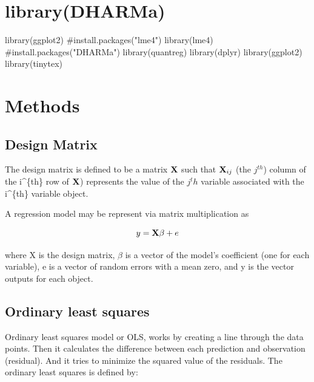 \documentclass[
  letterpaper,
  DIV=11,
  numbers=noendperiod]{scrreprt}
\newenvironment{Shaded}{\begin{snugshade}}{\end{snugshade}}
\newcommand{\CommentTok}[1]{\textcolor[rgb]{0.37,0.37,0.37}{#1}}
\newcommand{\FunctionTok}[1]{\textcolor[rgb]{0.28,0.35,0.67}{#1}}
\newcommand{\NormalTok}[1]{\textcolor[rgb]{0.00,0.23,0.31}{#1}}
\begin{document}

\hypertarget{librarydharma}{%
\chapter{library(DHARMa)}\label{librarydharma}}

\begin{Shaded}
\begin{Highlighting}[]
\FunctionTok{library}\NormalTok{(ggplot2)}
\CommentTok{\#install.packages("lme4")}
\FunctionTok{library}\NormalTok{(lme4)}
\CommentTok{\#install.packages("DHARMa")}
\FunctionTok{library}\NormalTok{(quantreg)}
\FunctionTok{library}\NormalTok{(dplyr)}
\FunctionTok{library}\NormalTok{(ggplot2)}
\FunctionTok{library}\NormalTok{(tinytex)}
\end{Highlighting}
\end{Shaded}


\hypertarget{methods}{%
\chapter{Methods}\label{methods}}

\hypertarget{design-matrix}{%
\section{Design Matrix}\label{design-matrix}}

The design matrix is defined to be a matrix \(\textbf X\) such that
\(\textbf X_{ij}\) (the \(j^{th}\)) column of the i\^{}\{th\} row of
\(\textbf X\)) represents the value of the \(j^th\) variable associated
with the i\^{}\{th\} variable object.

A regression model may be represent via matrix multiplication as

\[
y=\textbf X\beta + e
\]

where X is the design matrix, \(\beta\) is a vector of the model's
coefficient (one for each variable), e is a vector of random errors with
a mean zero, and y is the vector outputs for each object.

\hypertarget{ordinary-least-squares}{%
\section{Ordinary least squares}\label{ordinary-least-squares}}

Ordinary least squares model or OLS, works by creating a line through
the data points. Then it calculates the difference between each
prediction and observation (residual). And it tries to minimize the
squared value of the residuals. The ordinary least squares is defined
by:
\end{document}
